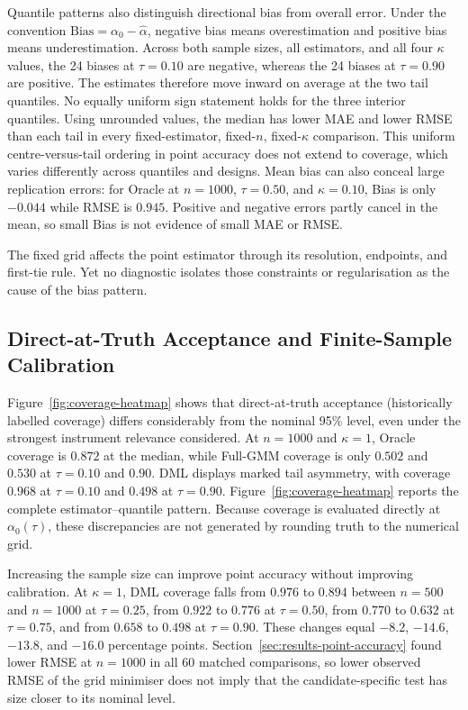 Quantile patterns also distinguish directional bias from overall error. Under the convention $\mathrm{Bias}=\alpha_0-\widehat\alpha$, negative bias means overestimation and positive bias means underestimation. Across both sample sizes, all estimators, and all four $\kappa$ values, the 24 biases at $\tau=0.10$ are negative, whereas the 24 biases at $\tau=0.90$ are positive. The estimates therefore move inward on average at the two tail quantiles. No equally uniform sign statement holds for the three interior quantiles. Using unrounded values, the median has lower MAE and lower RMSE than each tail in every fixed-estimator, fixed-$n$, fixed-$\kappa$ comparison. This uniform centre-versus-tail ordering in point accuracy does not extend to coverage, which varies differently across quantiles and designs. Mean bias can also conceal large replication errors: for Oracle at $n=1000$, $\tau=0.50$, and $\kappa=0.10$, Bias is only $-0.044$ while RMSE is $0.945$. Positive and negative errors partly cancel in the mean, so small Bias is not evidence of small MAE or RMSE.

The fixed grid affects the point estimator through its resolution, endpoints, and first-tie rule. Yet no diagnostic isolates those constraints or regularisation as the cause of the bias pattern.

\subsection{Direct-at-Truth Acceptance and Finite-Sample Calibration}
\label{sec:results-coverage}

Figure~\ref{fig:coverage-heatmap} shows that direct-at-truth acceptance (historically labelled coverage) differs considerably from the nominal 95\% level, even under the strongest instrument relevance considered. At $n=1000$ and $\kappa=1$, Oracle coverage is $0.872$ at the median, while Full-GMM coverage is only $0.502$ and $0.530$ at $\tau=0.10$ and $0.90$. DML displays marked tail asymmetry, with coverage $0.968$ at $\tau=0.10$ and $0.498$ at $\tau=0.90$. Figure~\ref{fig:coverage-heatmap} reports the complete estimator--quantile pattern. Because coverage is evaluated directly at $\alpha_0(\tau)$, these discrepancies are not generated by rounding truth to the numerical grid.



Increasing the sample size can improve point accuracy without improving calibration. At $\kappa=1$, DML coverage falls from $0.976$ to $0.894$ between $n=500$ and $n=1000$ at $\tau=0.25$, from $0.922$ to $0.776$ at $\tau=0.50$, from $0.770$ to $0.632$ at $\tau=0.75$, and from $0.658$ to $0.498$ at $\tau=0.90$. These changes equal $-8.2$, $-14.6$, $-13.8$, and $-16.0$ percentage points. Section~\ref{sec:results-point-accuracy} found lower RMSE at $n=1000$ in all 60 matched comparisons, so lower observed RMSE of the grid minimiser does not imply that the candidate-specific test has size closer to its nominal level.

